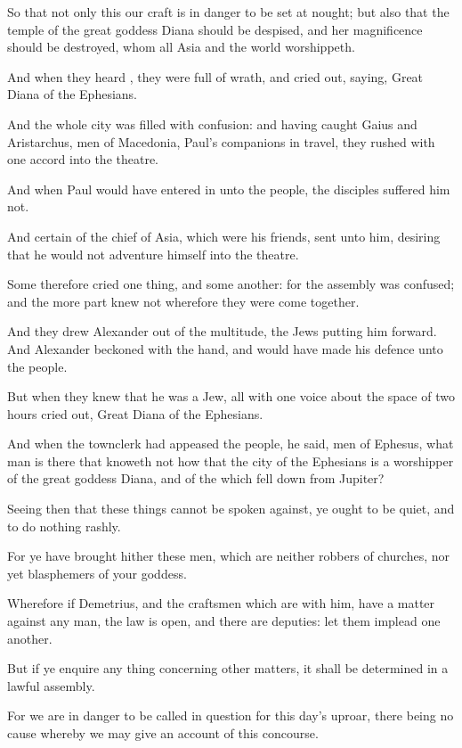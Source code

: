 {So
that
not
only
this
our
craft is in
danger
to be
set at
nought;
but
also that
the
temple of the
great
goddess
Diana should
be
despised,
and
her
magnificence should be
destroyed,
whom
all
Asia
and the
world
worshippeth.

And when they
heard
{}, they
were
full of
wrath,
and cried
out,
saying,
Great
{}
Diana of the
Ephesians.

And the
whole
city was
filled with
confusion:
and having
caught
Gaius
and
Aristarchus, men of
Macedonia,
Paul’s companions in
travel, they
rushed with one
accord
into the
theatre.

And when
Paul
would have entered
in
unto the
people, the
disciples
suffered
him
not.

And
certain of the chief of
Asia, which
were
his
friends,
sent
unto
him,
desiring
{} that he
would
not adventure
himself
into the
theatre.

Some
therefore cried one
thing,
and
some
another:
for the
assembly
was
confused;
and the more
part
knew
not
wherefore they were come
together.

And they
drew
Alexander out
of the
multitude, the
Jews
putting
him
forward.
And
Alexander
beckoned with the
hand, and would
have made his
defence unto the
people.

But when they
knew
that he
was a
Jew,
all
with
one
voice about the
space
of
two
hours cried
out,
Great
{}
Diana of the
Ephesians.

And when the
townclerk had
appeased the
people, he
said,
{}
men of
Ephesus,
what
man is
there
that
knoweth
not how that the
city of the
Ephesians
is a
worshipper of the
great
goddess
Diana,
and of
the
{} which fell down from
Jupiter?

Seeing then
that these
things cannot be spoken
against,
ye
ought to
be
quiet,
and to
do
nothing
rashly.

For ye have brought
hither
these
men, which
are
neither robbers of
churches, nor
yet
blasphemers of
your
goddess.

Wherefore
if
Demetrius,
and the
craftsmen which
are
with
him,
have a
matter
against any
man, the
law is
open,
and there
are
deputies: let them
implead one
another.

But
if ye
enquire any
thing
concerning other
matters, it shall be
determined
in a
lawful
assembly.

For we are in
danger to be called in
question
for this
day’s
uproar, there
being
no cause
whereby we
may
give an
account
of
this
concourse.

}
